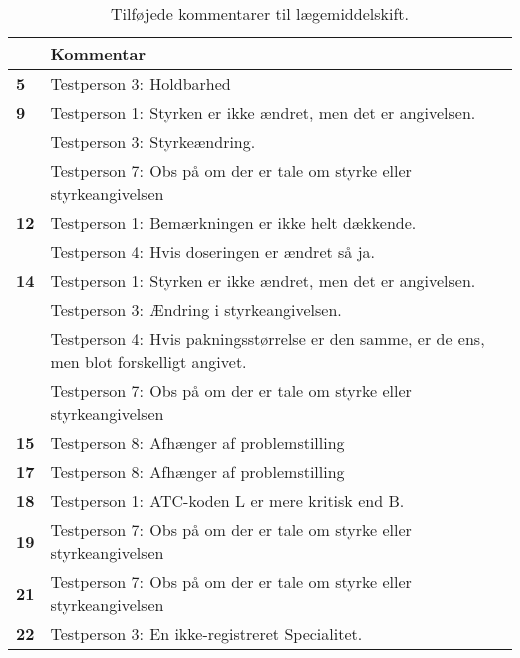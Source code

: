 \begin{longtable} {|p{2.2cm}|p{12cm}|}\caption{Tilføjede kommentarer til lægemiddelskift.}
	\label{table:resultat2} \\
	\rowcolor[HTML]{C0C0C0}{\textbf{Lægemiddel nummer}} & \textbf{Kommentar} \\\hline
	\cellcolor[HTML]{C0C0C0}\textbf{5} & Testperson 3: Holdbarhed \\ \hline
\cellcolor[HTML]{C0C0C0}\textbf{9}\multirow{3}{*}{} & Testperson 1: Styrken er ikke ændret, men det er angivelsen.  \\\cline{2-2}
 \cellcolor[HTML]{C0C0C0}       & Testperson 3: Styrkeændring. \\ \cline{2-2}
     \cellcolor[HTML]{C0C0C0}             &Testperson 7: Obs på om der er tale om styrke eller styrkeangivelsen \\ \hline
\cellcolor[HTML]{C0C0C0}\textbf{12}\multirow{2}{*}{} & Testperson 1: Bemærkningen er ikke helt dækkende.  \\ \cline{2-2}
\cellcolor[HTML]{C0C0C0}  & Testperson 4: Hvis doseringen er ændret så ja.  \\ \hline
\cellcolor[HTML]{C0C0C0} \textbf{14} \multirow{4}{*}{} &  Testperson 1: Styrken er ikke ændret, men det er angivelsen.  \\ \cline{2-2}
\cellcolor[HTML]{C0C0C0}			& Testperson 3: Ændring i styrkeangivelsen.  \\ \cline{2-2}
\cellcolor[HTML]{C0C0C0}                  & Testperson 4: Hvis pakningsstørrelse er den samme, er de ens, men blot forskelligt angivet. \\ \cline{2-2} \cellcolor[HTML]{C0C0C0} & Testperson 7: Obs på om der er tale om styrke eller styrkeangivelsen  \\ \hline        
\cellcolor[HTML]{C0C0C0}\textbf{15}   & Testperson 8:  Afhænger af problemstilling  \\ \hline
\cellcolor[HTML]{C0C0C0}\textbf{17} & Testperson 8:  Afhænger af problemstilling  \\ \hline
\cellcolor[HTML]{C0C0C0}\textbf{18} & Testperson 1: ATC-koden L er mere kritisk end B. \\ \hline 
\cellcolor[HTML]{C0C0C0}\textbf{19} & Testperson 7: Obs på om der er tale om styrke eller styrkeangivelsen \\ \hline
\cellcolor[HTML]{C0C0C0}\textbf{21} & Testperson 7: Obs på om der er tale om styrke eller styrkeangivelsen \\ \hline    
\cellcolor[HTML]{C0C0C0} \textbf{22}   & Testperson 3: En ikke-registreret Specialitet. \\ \hline

\end{longtable}
